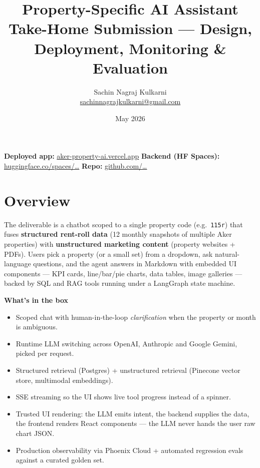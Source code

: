 \documentclass[11pt,a4paper]{article}
\title{\vspace{-1em}\textbf{Property-Specific AI Assistant}\\[2pt]
\large Take-Home Submission — Design, Deployment, Monitoring \& Evaluation}
\author{Sachin Nagraj Kulkarni \\ \small \href{mailto:sachinnagrajkulkarni@gmail.com}{sachinnagrajkulkarni@gmail.com}}
\date{May 2026}
\begin{document}
\maketitle
\thispagestyle{empty}

\begin{center}
\small
\textbf{Deployed app:} \href{https://aker-property-ai.vercel.app}{aker-property-ai.vercel.app} \quad\textbar\quad
\textbf{Backend (HF Spaces):} \href{https://huggingface.co/spaces}{huggingface.co/spaces/\dots} \quad\textbar\quad
\textbf{Repo:} \href{https://github.com/}{github.com/\dots}
\end{center}
\vspace{-0.5em}

\section{Overview}

The deliverable is a chatbot scoped to a single property code (e.g.\ \texttt{115r}) that fuses
\textbf{structured rent-roll data} (12 monthly snapshots of multiple Aker properties) with
\textbf{unstructured marketing content} (property websites + PDFs). Users pick a property (or
a small set) from a dropdown, ask natural-language questions, and the agent answers in
Markdown with embedded UI components --- KPI cards, line/bar/pie charts, data tables, image
galleries --- backed by SQL and RAG tools running under a LangGraph state machine.

\textbf{What's in the box}

\begin{itemize}
  \item Scoped chat with human-in-the-loop \emph{clarification} when the property or month is ambiguous.
  \item Runtime LLM switching across OpenAI, Anthropic and Google Gemini, picked per request.
  \item Structured retrieval (Postgres) + unstructured retrieval (Pinecone vector store, multimodal embeddings).
  \item SSE streaming so the UI shows live tool progress instead of a spinner.
  \item Trusted UI rendering: the LLM emits intent, the backend supplies the data, the frontend renders React components --- the LLM never hands the user raw chart JSON.
  \item Production observability via Phoenix Cloud + automated regression evals against a curated golden set.
\end{itemize}
\end{document}
